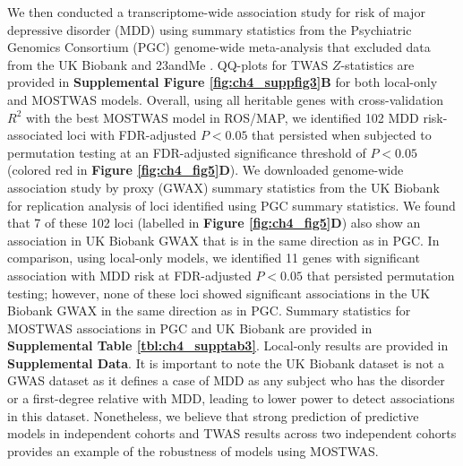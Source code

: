 We then conducted a transcriptome-wide
association study for risk of major
depressive disorder (MDD) using
summary statistics from the Psychiatric
Genomics Consortium (PGC) genome-wide meta-analysis
that excluded data from the UK Biobank and 
23andMe \cite{Wray2018Genome-wideDepression}.
QQ-plots for TWAS $Z$-statistics
are provided in \textbf{Supplemental Figure
\ref{fig:ch4_suppfig3}B}
for both local-only and MOSTWAS models.
Overall, using all heritable genes with
cross-validation $R^2$ with the best MOSTWAS model
in ROS/MAP, we identified 102 MDD risk-associated loci
with FDR-adjusted $P < 0.05$
 that persisted when subjected to permutation
testing at an FDR-adjusted significance threshold of $P < 0.05$
(colored red in \textbf{Figure \ref{fig:ch4_fig5}D}).
We downloaded genome-wide
association study by proxy (GWAX) summary statistics
from the UK Biobank \cite{Liu2017Case-controlDisease} for replication
analysis of loci identified
using PGC summary statistics. We found that 7
of these 102 loci (labelled
in \textbf{Figure \ref{fig:ch4_fig5}D}) also show an association in UK Biobank
GWAX that is in the same
direction as in PGC.
In comparison,
using local-only models,
we identified 11 genes
with significant association
with MDD risk at FDR-adjusted $P < 0.05$
that persisted permutation testing;
however, none of these loci
showed significant associations
in the UK Biobank GWAX
in the same direction as in PGC.
Summary statistics for MOSTWAS associations
in PGC and UK Biobank are provided 
in \textbf{Supplemental Table \ref{tbl:ch4_supptab3}}.
Local-only results are provided in \textbf{Supplemental
Data}.
It is important to note the UK Biobank dataset is not a GWAS 
dataset as it defines
a case of MDD as any 
subject 
who has the disorder or a first-degree relative 
with MDD, leading to lower power
to detect associations in this
dataset. Nonetheless, we believe that  
strong prediction
of predictive models in independent
cohorts and TWAS results across
two independent cohorts provides
an example of the robustness
of models using MOSTWAS.

